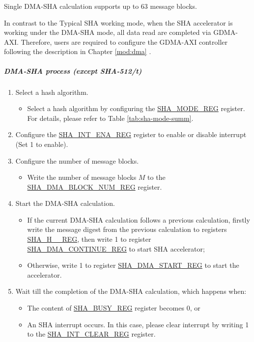 \documentclass[main\_\_EN.tex]{subfiles}
\begin{document}
Single DMA-SHA calculation supports up to 63 message blocks.

In contrast to the Typical SHA working mode, when the SHA accelerator is working under the DMA-SHA mode, all data read are completed via GDMA-AXI. Therefore, users are required to configure the GDMA-AXI controller following the description in Chapter \ref{mod:dma} \textit{}.

\subparagraph{DMA-SHA process (except SHA-512/{\it{t}})}

\begin{enumerate}
    \item Select a hash algorithm.
    \begin{itemize}
        \item Select a hash algorithm by configuring the \hyperref[regdesc:SHAMODEREG]{SHA\_MODE\_REG} register. For details, please refer to Table \ref{tab:sha-mode-summ}.
    \end{itemize}
    \item Configure the \hyperref[regdesc:SHAINTENAREG]{SHA\_INT\_ENA\_REG} register to enable or disable interrupt (Set 1 to enable).
    \item Configure the number of message blocks.
    \begin{itemize}
        \item  Write the number of message blocks \begin{math}M\end{math} to the  \hyperref[regdesc:SHADMABLOCKNUMREG]{SHA\_DMA\_BLOCK\_NUM\_REG} register.
    \end{itemize}
    \item Start the DMA-SHA calculation.
        \begin{itemize}
            \item If the current DMA-SHA calculation follows a previous calculation, firstly write the message digest from the previous calculation to registers \hyperref[regdesc:SHAHNREG]{SHA\_H\_\_REG}, then write 1 to register \hyperref[regdesc:SHADMACONTINUEREG]{SHA\_DMA\_CONTINUE\_REG} to start SHA accelerator;
            \item Otherwise, write 1 to register \hyperref[regdesc:SHADMASTARTREG]{SHA\_DMA\_START\_REG} to start the accelerator.
        \end{itemize}
    \item Wait till the completion of the DMA-SHA calculation, which happens when:
        \begin{itemize}
            \item The content of \hyperref[regdesc:SHABUSYREG]{SHA\_BUSY\_REG} register becomes 0, or
            \item An SHA interrupt occurs. In this case, please clear interrupt by writing 1 to the \hyperref[regdesc:SHAINTCLEARREG]{SHA\_INT\_CLEAR\_REG} register.
        \end{itemize}


\end{enumerate}
\end{document}
